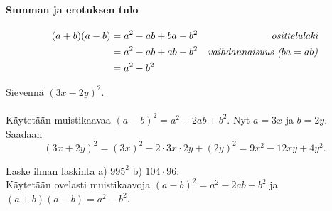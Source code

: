 \paragraph*{Summan ja erotuksen tulo}

\begin{align*}
(a+b)(a-b) &= a^2-ab+ba-b^2 &\emph{osittelulaki} \\
&= a^2-ab+ab-b^2 &\emph{vaihdannaisuus ($ba=ab$)} \\
&= a^2-b^2
\end{align*}

\begin{esimerkki}
Sievennä $(3x-2y)^2$. \\
\quad\\
Käytetään muistikaavaa $(a-b)^2 = a^2-2ab+b^2$. Nyt $a = 3x$ ja $b = 2y$.
Saadaan
        \[ (3x+2y)^2 = (3x)^2-2\cdot 3x\cdot 2y+(2y)^2 = 9x^2-12xy+4y^2. \]
\end{esimerkki}

\begin{esimerkki}
Laske ilman laskinta a) $995^2$ b) $104 \cdot 96$. \\
Käytetään ovelasti muistikaavoja $(a-b)^2 = a^2-2ab+b^2$ ja \mbox{$(a+b)(a-b) = a^2-b^2$}.
\begin{alakohdat}
\end{alakohdat}
\end{esimerkki}

